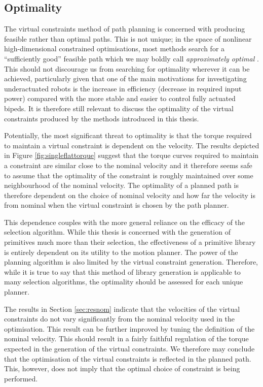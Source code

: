 \subsection{Optimality}
The virtual constraints method of path planning is concerned with producing feasible rather than optimal paths. This is not unique; in the space of nonlinear high-dimensional constrained optimisations, most methods search for a ``sufficiently good'' feasible path which we may boldly call \textit{approximately optimal} \cite{kavraki1996probabilistic, hwang1992potential, quinlan1993elastic}. This should not discourage us from searching for optimality wherever it can be achieved, particularly given that one of the main motivations for investigating underactuated robots is the increase in efficiency (decrease in required input power) compared with the more stable and easier to control fully actuated bipeds. It is therefore still relevant to discuss the optimality of the virtual constraints produced by the methods introduced in this thesis. 

Potentially, the most significant threat to optimality is that the torque required to maintain a virtual constraint is dependent on the velocity. The results depicted in Figure \ref{fig:singleflattorque} suggest that the torque curves required to maintain a constraint are similar close to the nominal velocity and it therefore seems safe to assume that the optimality of the constraint is roughly maintained over some neighbourhood of the nominal velocity. The optimality of a planned path is therefore dependent on the choice of nominal velocity and how far the velocity is from nominal when the virtual constraint is chosen by the path planner.

This dependence couples with the more general reliance on the efficacy of the selection algorithm. While this thesis is concerned with the generation of primitives much more than their selection, the effectiveness of a primitive library is entirely dependent on its utility to the motion planner. The power of the planning algorithm is also limited by the virtual constraint generation. Therefore, while it is true to say that this method of library generation is applicable to many selection algorithms, the optimality should be assessed for each unique planner.

The results in Section \ref{sec:resnom} indicate that the velocities of the virtual constraints do not vary significantly from the nominal velocity used in the optimisation. This result can be further improved by tuning the definition of the nominal velocity. This should result in a fairly faithful regulation of the torque expected in the generation of the virtual constraints. We therefore may conclude that the optimisation of the virtual constraints is reflected in the planned path. This, however, does not imply that the optimal choice of constraint is being performed.

